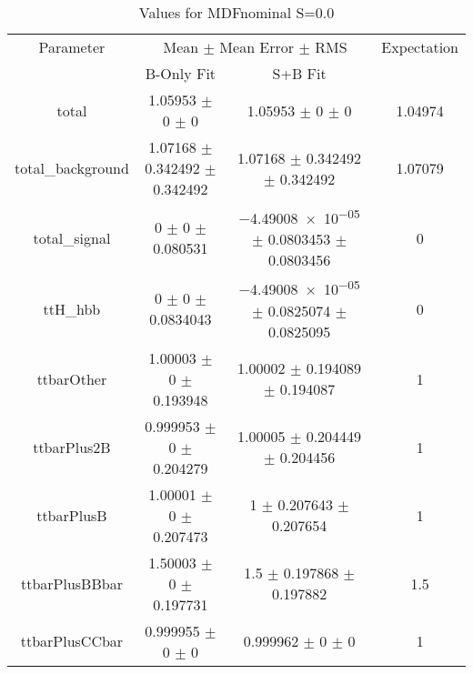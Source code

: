 \begin{table}
\centering
\caption{Values for MDFnominal S=0.0}
\begin{tabular}{cccc}
\toprule
Parameter & \multicolumn{2}{c}{Mean $\pm$ Mean Error $\pm$ RMS} & Expectation\\
 & B-Only Fit & S+B Fit & \\
\midrule
total & \num{1.05953} $\pm$ \num{0} $\pm$ \num{0} & \num{1.05953} $\pm$ \num{0} $\pm$ \num{0} & \num{1.04974}\\
total\_background & \num{1.07168} $\pm$ \num{0.342492} $\pm$ \num{0.342492} & \num{1.07168} $\pm$ \num{0.342492} $\pm$ \num{0.342492} & \num{1.07079}\\
total\_signal & \num{0} $\pm$ \num{0} $\pm$ \num{0.080531} & \num{-4.49008e-05} $\pm$ \num{0.0803453} $\pm$ \num{0.0803456} & \num{0}\\
ttH\_hbb & \num{0} $\pm$ \num{0} $\pm$ \num{0.0834043} & \num{-4.49008e-05} $\pm$ \num{0.0825074} $\pm$ \num{0.0825095} & \num{0}\\
ttbarOther & \num{1.00003} $\pm$ \num{0} $\pm$ \num{0.193948} & \num{1.00002} $\pm$ \num{0.194089} $\pm$ \num{0.194087} & \num{1}\\
ttbarPlus2B & \num{0.999953} $\pm$ \num{0} $\pm$ \num{0.204279} & \num{1.00005} $\pm$ \num{0.204449} $\pm$ \num{0.204456} & \num{1}\\
ttbarPlusB & \num{1.00001} $\pm$ \num{0} $\pm$ \num{0.207473} & \num{1} $\pm$ \num{0.207643} $\pm$ \num{0.207654} & \num{1}\\
ttbarPlusBBbar & \num{1.50003} $\pm$ \num{0} $\pm$ \num{0.197731} & \num{1.5} $\pm$ \num{0.197868} $\pm$ \num{0.197882} & \num{1.5}\\
ttbarPlusCCbar & \num{0.999955} $\pm$ \num{0} $\pm$ \num{0} & \num{0.999962} $\pm$ \num{0} $\pm$ \num{0} & \num{1}\\
\bottomrule
\end{tabular}
\end{table}